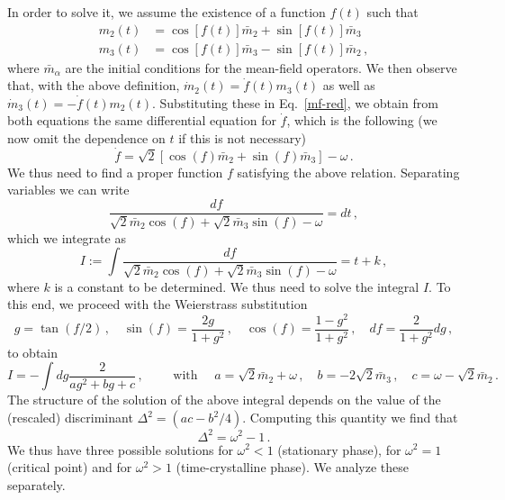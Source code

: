 \documentclass[prl,superscriptaddress,showpacs,longbibliography,reprint]{revtex4-2}
\begin{document}
In order to solve it, we assume the existence of a function $f(t)$ such that 
\begin{equation}
\begin{split}
{m}_2(t)&=\cos [f(t)] \bar{m}_2 +\sin [f(t)] \bar{m}_3 \\
{m}_3(t)&=\cos [f(t)] \bar{m}_3 -\sin [f(t)] \bar{m}_2 \, ,
\end{split}
    \label{ansatz}
\end{equation}
where $\bar{m}_\alpha$ are the initial conditions for the mean-field operators. We then observe that, with the above definition, $\dot{m}_2(t)=\dot{f}(t)m_3(t)$ as well as $\dot{m}_3(t)=-\dot{f}(t)m_2(t)$. Substituting these in Eq.~\eqref{mf-red}, we obtain from both equations the same differential equation for $\dot{f}$, which is the following (we now omit the dependence on $t$ if this is not necessary)
\begin{equation}
    \dot{f}=\sqrt{2}[\cos (f) \bar{m}_2+\sin (f) \bar{m}_3]-\omega\, .
\end{equation}
We thus need to find a proper function $f$ satisfying the above relation. Separating variables we can write 
$$
\frac{df}{\sqrt{2}\bar{m}_2 \cos(f)+\sqrt{2}\bar{m}_3 \sin (f) -\omega}=dt\, ,
$$
which  we integrate  as 
\begin{equation}
I:= \int \frac{df}{\sqrt{2}\bar{m}_2 \cos(f)+\sqrt{2}\bar{m}_3 \sin (f) -\omega} =t+k\, ,
    \label{int-f}
\end{equation}
where $k$ is a constant to be determined. We thus need to solve the integral $I$. To this end, we proceed with the Weierstrass substitution
\begin{equation}
    g=\tan (f/2) \, , \quad \sin(f)=\frac{2g}{1+g^2}\, , \quad \cos (f)=\frac{1-g^2}{1+g^2}\, , \quad df=\frac{2}{1+g^2} dg\, ,
\end{equation}
to obtain
$$
I=-\int dg \frac{2}{ag^2 +bg+c}\, , \qquad \mbox{ with }\quad a=\sqrt{2}\bar{m}_2+\omega \, , \quad b=-2\sqrt{2}\bar{m}_3 \, ,\quad c=\omega -\sqrt{2}\bar{m}_2\, .
$$
The structure of the solution of the above integral depends on the value of the (rescaled) discriminant $\Delta^2=(ac-b^2/4)$. Computing this quantity we find that 
$$
\Delta^2=\omega^2-1\, .
$$
We thus have three possible solutions for $\omega^2<1$ (stationary phase), for $\omega^2=1$ (critical point) and for $\omega^2>1$ (time-crystalline phase). We analyze these separately. 
\end{document}
